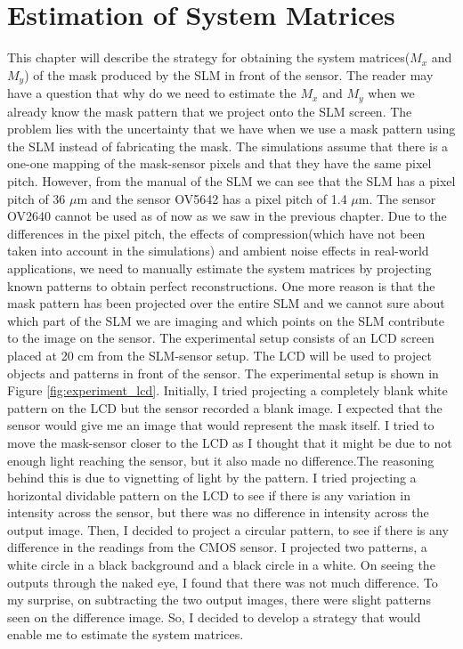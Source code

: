 \chapter{Estimation of System Matrices}
This chapter will describe the strategy for obtaining the system matrices($M_x$ and $M_y$) of the mask produced by the SLM in front of the sensor. The reader may have a question that why do we need to estimate the $M_x$ and $M_y$ when we already know the mask pattern that we project onto the SLM screen. The problem lies with the uncertainty that we have when we use a mask pattern using the SLM instead of fabricating the mask. The simulations assume that there is a one-one mapping of the mask-sensor pixels and that they have the same pixel pitch. However, from the manual of the SLM\cite{LC2012MAN}  we can see that the SLM has a pixel pitch of 36 $\mu$m and the sensor OV5642 has a pixel pitch of 1.4 $\mu$m. The sensor OV2640 cannot be used as of now as we saw in the previous chapter. Due to the differences in the pixel pitch, the effects of compression(which have not been taken into account in the simulations) and ambient noise effects in real-world applications, we need to manually estimate the system matrices by projecting known patterns to obtain perfect reconstructions. One more reason is that the mask pattern has been projected over the entire SLM and we cannot sure about which part of the SLM we are imaging and which points on the SLM contribute to the image on the sensor. 
The experimental setup consists of an LCD screen placed at 20 cm from the SLM-sensor setup. The LCD will be used to project objects and patterns in front of the sensor. The experimental setup is shown in Figure \ref{fig:experiment_lcd}.
Initially, I tried projecting a completely blank white pattern on the LCD but the sensor recorded a blank image. I expected that the sensor would give me an image that would represent the mask itself. I tried to move the mask-sensor closer to the LCD as I thought that it might be due to not enough light reaching the sensor, but it also made no difference.The reasoning behind this is due to vignetting of light by the pattern. I tried projecting a horizontal dividable pattern on the LCD to see if there is any variation in intensity across the sensor, but there was no difference in intensity across the output image. Then, I decided to project a circular pattern, to see if there is any difference in the readings from the CMOS sensor. I projected two patterns, a white circle in a black background and a black circle in a white. On seeing the outputs through the naked eye, I found that there was not much difference. To my surprise, on subtracting the two output images, there were slight patterns seen on the difference image. So, I decided to develop a strategy that would enable me to estimate the system matrices.

